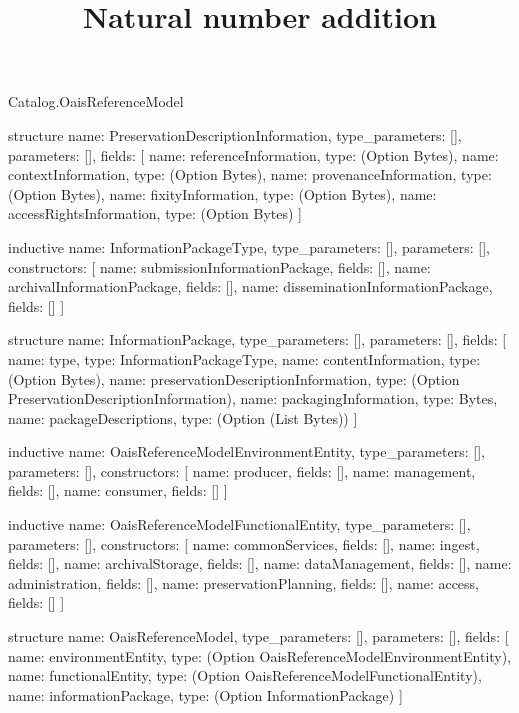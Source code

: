 \begin{lexlean}{Catalog.OaisReferenceModel}
\title{Natural number addition}
\begin{semanticmodule}
structure{
  name: PreservationDescriptionInformation,
  type_parameters: [],
  parameters: [],
  fields: [
    {name: referenceInformation, type: (Option Bytes)},
    {name: contextInformation, type: (Option Bytes)},
    {name: provenanceInformation, type: (Option Bytes)},
    {name: fixityInformation, type: (Option Bytes)},
    {name: accessRightsInformation, type: (Option Bytes)}
  ]
}

inductive{
  name: InformationPackageType,
  type_parameters: [],
  parameters: [],
  constructors: [
    {name: submissionInformationPackage, fields: []},
    {name: archivalInformationPackage, fields: []},
    {name: disseminationInformationPackage, fields: []}
  ]
}

structure{
  name: InformationPackage,
  type_parameters: [],
  parameters: [],
  fields: [
    {name: type, type: InformationPackageType},
    {name: contentInformation, type: (Option Bytes)},
    {name: preservationDescriptionInformation, type: (Option PreservationDescriptionInformation)},
    {name: packagingInformation, type: Bytes},
    {name: packageDescriptions, type: (Option (List Bytes))}
  ]
}

inductive{
  name: OaisReferenceModelEnvironmentEntity,
  type_parameters: [],
  parameters: [],
  constructors: [
    {name: producer, fields: []},
    {name: management, fields: []},
    {name: consumer, fields: []}
  ]
}

inductive{
  name: OaisReferenceModelFunctionalEntity,
  type_parameters: [],
  parameters: [],
  constructors: [
    {name: commonServices, fields: []},
    {name: ingest, fields: []},
    {name: archivalStorage, fields: []},
    {name: dataManagement, fields: []},
    {name: administration, fields: []},
    {name: preservationPlanning, fields: []},
    {name: access, fields: []}
  ]
}

structure{
  name: OaisReferenceModel,
  type_parameters: [],
  parameters: [],
  fields: [
    {name: environmentEntity, type: (Option OaisReferenceModelEnvironmentEntity)},
    {name: functionalEntity, type: (Option OaisReferenceModelFunctionalEntity)},
    {name: informationPackage, type: (Option InformationPackage)}
  ]
}
\end{semanticmodule}
\end{lexlean}
